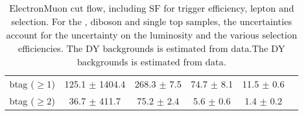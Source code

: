 \documentclass[amsmath,amssymb]{revtex4}
\begin{document}
\begin{landscape}
\begin{table}[p]
\begin{tabular}{|l|c|c|c|c|c|}
btag ($\ge$1) & 125.1 $\pm$ 1404.4 & 268.3 $\pm$ 7.5 & 74.7 $\pm$ 8.1 & 11.5 $\pm$ 0.6 \\
btag ($\ge$2) & 36.7 $\pm$ 411.7 & 75.2 $\pm$ 2.4 & 5.6 $\pm$ 0.6 & 1.4 $\pm$ 0.2 \\
\hline 
\hline
\end{tabular}
\caption{ ElectronMuon cut flow, including SF for trigger efficiency, lepton and \met selection. For the \ttbar, diboson and single top samples, the uncertainties account for the uncertainty on the luminosity and the various selection efficiencies. The DY backgrounds is estimated from data.The DY backgrounds is estimated from data.  }
\label{Table:CutFlow_emu}
\end{table}
\end{landscape}
\end{document}
